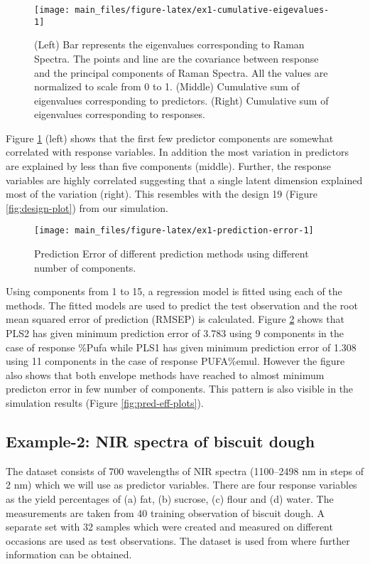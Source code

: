 \documentclass[12pt,3p,authoryear]{elsarticle}
\begin{document}
\begin{figure}
\texttt{[image: main\_files/figure-latex/ex1-cumulative-eigevalues-1]} \caption{(Left) Bar represents the eigenvalues
corresponding to Raman Spectra. The points and line are the covariance
between response and the principal components of Raman Spectra. All the
values are normalized to scale from 0 to 1. (Middle) Cumulative sum of
eigenvalues corresponding to predictors. (Right) Cumulative sum of
eigenvalues corresponding to responses.}\label{fig:ex1-cumulative-eigevalues}
\end{figure}

Figure \ref{fig:ex1-cumulative-eigevalues} (left) shows that the first
few predictor components are somewhat correlated with response
variables. In addition the most variation in predictors are explained by
less than five components (middle). Further, the response variables are
highly correlated suggesting that a single latent dimension explained
most of the variation (right). This resembles with the design 19 (Figure
\ref{fig:design-plot}) from our simulation.

\begin{figure}[!htb]
\texttt{[image: main\_files/figure-latex/ex1-prediction-error-1]} \caption{Prediction Error of different prediction methods using different number of components.}\label{fig:ex1-prediction-error}
\end{figure}

Using components from 1 to 15, a regression model is fitted using each
of the methods. The fitted models are used to predict the test
observation and the root mean squared error of prediction (RMSEP) is
calculated. Figure \ref{fig:ex1-prediction-error} shows that PLS2 has
given minimum prediction error of 3.783 using 9 components in the case
of response \%Pufa while PLS1 has given minimum prediction error of
1.308 using 11 components in the case of response PUFA\%emul. However
the figure also shows that both envelope methods have reached to almost
minimum predicton error in few number of components. This pattern is
also visible in the simulation results (Figure
\ref{fig:pred-eff-plots}).

\subsection{Example-2: NIR spectra of biscuit
dough}\label{example-2-nir-spectra-of-biscuit-dough}

The dataset consists of 700 wavelengths of NIR spectra (1100--2498 nm in
steps of 2 nm) which we will use as predictor variables. There are four
response variables as the yield percentages of (a) fat, (b) sucrose, (c)
flour and (d) water. The measurements are taken from 40 training
observation of biscuit dough. A separate set with 32 samples which were
created and measured on different occasions are used as test
observations. The dataset is used from \citet{indahl2005twist} where
further information can be obtained.
\end{document}
